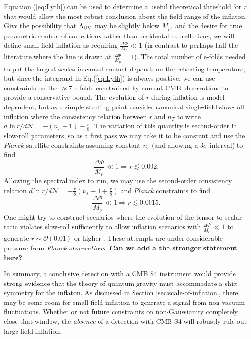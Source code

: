 Equation (\ref{eq:Lyth}) can be used to determine a useful theoretical threshold for $r$ that would allow the most robust conclusion about the field range of the inflaton. Give the possibility that $\Lambda_{\rm UV}$ may be slightly below $M_p$, and the desire for true parametric control of corrections rather than accidental cancellations, we will define small-field inflation as requiring $\frac{\Delta\Phi}{M_p}\ll1$ (in contrast to perhaps half the literature where the line is drawn at $\frac{\Delta\Phi}{M_p}=1$). The total number of e-folds needed to put the largest scales in causal contact depends on the reheating temperature, but since the integrand in Eq.(\ref{eq:Lyth}) is always positive, we can use constraints on the $\approx 7$ e-folds constrained by current CMB observations to provide a conservative bound. The evolution of $r$ during inflation is model dependent, but as a simple starting point consider canonical single-field slow-roll inflation where the consistency relation between $r$ and $n_T$ to write $d\ln r/d\mathcal{N}=-(n_s-1)-\frac{r}{8}$. The variation of this quantity is second-order in slow-roll parameters, so as a first pass we may take it to be constant and use the {\it Planck} satellite constraints assuming constant $n_s$ (and allowing a $3\sigma$ interval) to find
\begin{equation}
\frac{\Delta\Phi}{M_p}\ll1\Rightarrow r\lesssim0.002.
\end{equation}
Allowing the spectral index to run, we may use the second-order consistency relation $d\ln r/d\mathcal{N}=-\frac{r}{8}(n_s-1+\frac{r}{8})$ and {\it Planck} constraints to find 
\begin{equation}
\frac{\Delta\Phi}{M_p}\ll1\Rightarrow r\lesssim0.0015.
\end{equation}
One might try to construct scenarios where the evolution of the tensor-to-scalar ratio violates slow-roll sufficiently to allow inflation scenarios with $\frac{\Delta\Phi}{M_p}\ll1$ to generate $r\sim\mathcal{O}(0.01)$ or higher \cite{BenDayan:2009kv,Hotchkiss:2011gz, Chatterjee:2014hna}. These attempts are under considerable pressure from {\it Planck observations}. {\bf Can we add a the stronger statement here?}

In summary, a conclusive detection with a CMB S4 instrument would provide strong evidence that the theory of quantum gravity must accommodate a shift symmetry for the inflaton. As discussed in Section \ref{sec:scale-of-inflation}, there may be some room for small-field inflation to generate a signal from non-vacuum fluctuations. Whether or not future constraints on non-Gaussianity completely close that window, the {\it absence} of a detection with CMB S4 will robustly rule out large-field inflation. 

